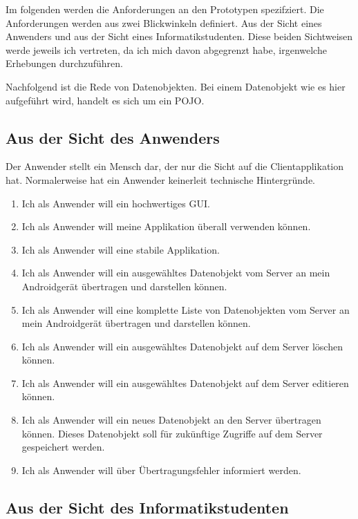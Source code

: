 \documentclass[listof=totocnumbered, bibliography=totocnumbered]{scrreprt}
\begin{document}
  Im folgenden werden die Anforderungen an den Prototypen spezifziert. Die
  Anforderungen werden aus zwei Blickwinkeln definiert. Aus der Sicht eines
  Anwenders und aus der Sicht eines Informatikstudenten. Diese beiden
  Sichtweisen werde jeweils ich vertreten, da ich mich davon abgegrenzt habe,
  irgenwelche Erhebungen durchzuführen.
  
  Nachfolgend ist die Rede von Datenobjekten. Bei einem Datenobjekt wie es hier
  aufgeführt wird, handelt es sich um ein \ac{POJO}. 
  
  \subsection{Aus der Sicht des Anwenders}
  
  Der Anwender stellt ein Mensch dar, der nur die Sicht auf die
  Clientapplikation hat. Normalerweise hat ein Anwender keinerleit technische
  Hintergründe.
  
  
  \begin{enumerate}
    \item Ich als Anwender will ein hochwertiges \ac{GUI}.
    \item Ich als Anwender will meine Applikation überall verwenden können.
    \item Ich als Anwender will eine stabile Applikation.
    \item Ich als Anwender will ein ausgewähltes Datenobjekt vom Server an mein
    Androidgerät übertragen und darstellen können.
    \item Ich als Anwender will eine komplette Liste von Datenobjekten vom
    Server an mein Androidgerät übertragen und darstellen können.
    \item Ich als Anwender will ein ausgewähltes Datenobjekt auf dem Server
    löschen können.
    \item Ich als Anwender will ein ausgewähltes Datenobjekt auf dem Server
    editieren können.
    \item Ich als Anwender will ein neues Datenobjekt an den Server übertragen
    können. Dieses Datenobjekt soll für zukünftige Zugriffe auf dem Server
    gespeichert werden.
    \item Ich als Anwender will über Übertragungsfehler informiert werden.
    \setcounter{userStoriesZaehler}{\value{enumi}}
  \end{enumerate}
  
  \subsection{Aus der Sicht des Informatikstudenten}
  
\end{document}
